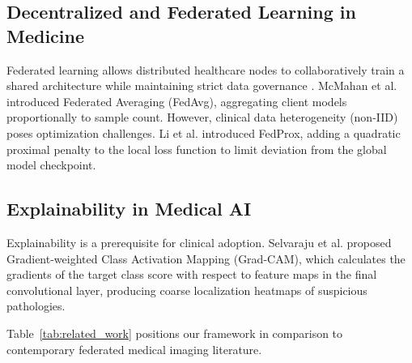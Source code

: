 \documentclass[journal]{IEEEtran}
\begin{document}
\subsection{Decentralized and Federated Learning in Medicine}
Federated learning allows distributed healthcare nodes to collaboratively train a shared architecture while maintaining strict data governance \cite{sheller2019multi, sheller2020federated, kaissis2020secure, li2024federated}. McMahan et al. \cite{mcmahan2017communication} introduced Federated Averaging (FedAvg), aggregating client models proportionally to sample count. However, clinical data heterogeneity (non-IID) poses optimization challenges. Li et al. \cite{li2020federated} introduced FedProx, adding a quadratic proximal penalty to the local loss function to limit deviation from the global model checkpoint.

\subsection{Explainability in Medical AI}
Explainability is a prerequisite for clinical adoption. Selvaraju et al. \cite{selvaraju2017gradcam} proposed Gradient-weighted Class Activation Mapping (Grad-CAM), which calculates the gradients of the target class score with respect to feature maps in the final convolutional layer, producing coarse localization heatmaps of suspicious pathologies.

Table~\ref{tab:related_work} positions our framework in comparison to contemporary federated medical imaging literature.
\end{document}
